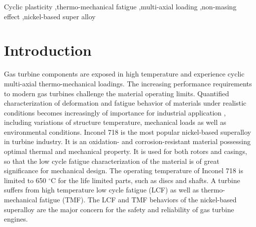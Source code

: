 \documentclass[preprint,5p,twocolumn,11pt,sort&compress]{elsarticle}
\begin{document}
\begin{frontmatter}
%
\begin{keyword}
Cyclic plasticity \sep thermo-mechanical fatigue  \sep multi-axial loading \sep non-masing effect \sep nickel-based super alloy 
\end{keyword}
\end{frontmatter}

\section{Introduction}
\noindent Gas turbine components are exposed in high temperature and experience cyclic multi-axial thermo-mechanical loadings. The increasing performance requirements to modern gas turbines challenge the material operating limits. Quantified characterization of deformation and fatigue behavior of materials under realistic conditions becomes increasingly of importance for industrial application \cite{harrison1996modelling}, including variations of structure temperature, mechanical loads as well as environmental conditions. Inconel 718 is the most popular nickel-based superalloy in turbine industry. It is an oxidation- and corrosion-resistant material possessing optimal thermal and mechanical property. It is used for both rotors and casings, so that the low cycle fatigue characterization of the material is of great significance for mechanical design. The operating temperature of Inconel 718 is limited to 650 $^{\circ}$C for the life limited parts, such as discs and shafts.
A turbine suffers from high temperature low cycle fatigue (LCF) as well as thermo-mechanical fatigue (TMF).
The LCF and TMF behaviors of the nickel-based superalloy are the major concern for the safety and reliability of gas turbine engines.
\end{document}
